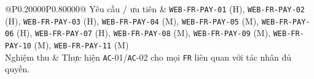 \begin{longtable}{@{}P{0.20000\SRSWidth}P{0.80000\SRSWidth}@{}}
Yêu cầu /\allowbreak{} ưu tiên & \texttt{WEB-\allowbreak{}FR-\allowbreak{}PAY-\allowbreak{}01} (H), \texttt{WEB-\allowbreak{}FR-\allowbreak{}PAY-\allowbreak{}02} (H), \texttt{WEB-\allowbreak{}FR-\allowbreak{}PAY-\allowbreak{}03} (H), \texttt{WEB-\allowbreak{}FR-\allowbreak{}PAY-\allowbreak{}04} (M), \texttt{WEB-\allowbreak{}FR-\allowbreak{}PAY-\allowbreak{}05} (M), \texttt{WEB-\allowbreak{}FR-\allowbreak{}PAY-\allowbreak{}06} (H), \texttt{WEB-\allowbreak{}FR-\allowbreak{}PAY-\allowbreak{}07} (H), \texttt{WEB-\allowbreak{}FR-\allowbreak{}PAY-\allowbreak{}08} (M), \texttt{WEB-\allowbreak{}FR-\allowbreak{}PAY-\allowbreak{}09} (M), \texttt{WEB-\allowbreak{}FR-\allowbreak{}PAY-\allowbreak{}10} (M), \texttt{WEB-\allowbreak{}FR-\allowbreak{}PAY-\allowbreak{}11} (M) \\[3pt]
Nghiệm thu & Thực hiện \texttt{AC}-01/\allowbreak{}\texttt{AC}-02 cho mọi \texttt{FR} liên quan với tác nhân đủ quyền. \\[3pt]
\end{longtable}
\endgroup

